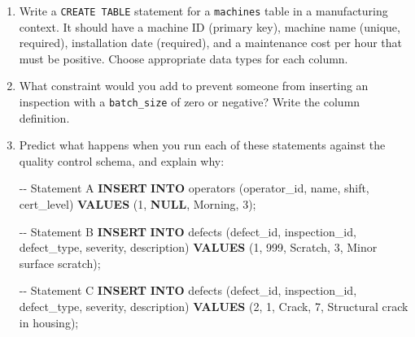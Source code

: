 \documentclass[
  letterpaper,
  DIV=11,
  numbers=noendperiod]{scrreprt}
\newenvironment{Shaded}{\begin{snugshade}}{\end{snugshade}}
\newcommand{\CommentTok}[1]{\textcolor[rgb]{0.37,0.37,0.37}{#1}}
\newcommand{\DecValTok}[1]{\textcolor[rgb]{0.68,0.00,0.00}{#1}}
\newcommand{\KeywordTok}[1]{\textcolor[rgb]{0.00,0.23,0.31}{\textbf{#1}}}
\newcommand{\NormalTok}[1]{\textcolor[rgb]{0.00,0.23,0.31}{#1}}
\newcommand{\StringTok}[1]{\textcolor[rgb]{0.13,0.47,0.30}{#1}}
\begin{document}
\begin{tcolorbox}[enhanced jigsaw, opacitybacktitle=0.6, arc=.35mm, colback=white, bottomtitle=1mm, opacityback=0, toprule=.15mm, left=2mm, colbacktitle=quarto-callout-note-color!10!white, breakable, coltitle=black, toptitle=1mm, colframe=quarto-callout-note-color-frame, bottomrule=.15mm, titlerule=0mm, title=\textcolor{quarto-callout-note-color}{\faInfo}\hspace{0.5em}{Exercises}, rightrule=.15mm, leftrule=.75mm]

\begin{enumerate}
\def\labelenumi{\arabic{enumi}.}
\item
  Write a \texttt{CREATE\ TABLE} statement for a \texttt{machines} table
  in a manufacturing context. It should have a machine ID (primary key),
  machine name (unique, required), installation date (required), and a
  maintenance cost per hour that must be positive. Choose appropriate
  data types for each column.
\item
  What constraint would you add to prevent someone from inserting an
  inspection with a \texttt{batch\_size} of zero or negative? Write the
  column definition.
\item
  Predict what happens when you run each of these statements against the
  quality control schema, and explain why:

  \begin{codelisting}

  \caption{\texttt{duckdb}}

\begin{Shaded}
\begin{Highlighting}[]
\CommentTok{{-}{-} Statement A}
\KeywordTok{INSERT} \KeywordTok{INTO}\NormalTok{ operators (operator\_id, name, shift, cert\_level)}
\KeywordTok{VALUES}\NormalTok{ (}\DecValTok{1}\NormalTok{, }\KeywordTok{NULL}\NormalTok{, }\StringTok{\textquotesingle{}Morning\textquotesingle{}}\NormalTok{, }\DecValTok{3}\NormalTok{);}

\CommentTok{{-}{-} Statement B}
\KeywordTok{INSERT} \KeywordTok{INTO}\NormalTok{ defects (defect\_id, inspection\_id, defect\_type, severity, description)}
\KeywordTok{VALUES}\NormalTok{ (}\DecValTok{1}\NormalTok{, }\DecValTok{999}\NormalTok{, }\StringTok{\textquotesingle{}Scratch\textquotesingle{}}\NormalTok{, }\DecValTok{3}\NormalTok{, }\StringTok{\textquotesingle{}Minor surface scratch\textquotesingle{}}\NormalTok{);}

\CommentTok{{-}{-} Statement C}
\KeywordTok{INSERT} \KeywordTok{INTO}\NormalTok{ defects (defect\_id, inspection\_id, defect\_type, severity, description)}
\KeywordTok{VALUES}\NormalTok{ (}\DecValTok{2}\NormalTok{, }\DecValTok{1}\NormalTok{, }\StringTok{\textquotesingle{}Crack\textquotesingle{}}\NormalTok{, }\DecValTok{7}\NormalTok{, }\StringTok{\textquotesingle{}Structural crack in housing\textquotesingle{}}\NormalTok{);}
\end{Highlighting}
\end{Shaded}


\end{codelisting}
\end{enumerate}
\end{tcolorbox}
\end{document}
